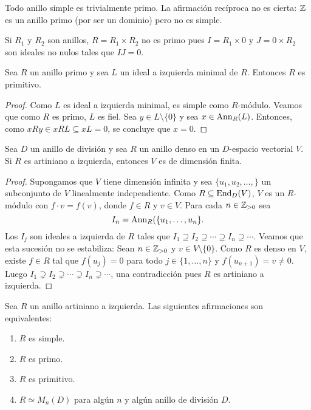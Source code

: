 \begin{example}
	Todo anillo simple es trivialmente primo. La afirmación recíproca no es
	cierta: $\mathbb{Z}$ es un anillo primo (por ser un dominio) pero no es simple.
\end{example}

\begin{example}
	Si $R_1$ y $R_2$ son anillos, $R=R_1\times R_2$ no es primo pues
	$I=R_1\times 0$ y $J=0\times R_2$ son ideales no nulos tales que $IJ=0$.
\end{example}

\begin{lemma}
	\label{lem:primoizqmin=>prim}
	Sea $R$ un anillo primo y sea $L$ un ideal a izquierda minimal de $R$.
	Entonces $R$ es primitivo.
\end{lemma}

\begin{proof}
	Como $L$ es ideal a izquierda minimal, es simple como $R$-módulo. Veamos
	que como $R$ es primo, $L$ es fiel. Sea $y\in L\setminus\{0\}$ y sea
	$x\in\operatorname{Ann}_R(L)$.  Entonces, como $xRy\in xRL\subseteq xL=0$, se concluye
	que $x=0$.
\end{proof}

\begin{lemma}
	\label{lem:denso_artiniano}
	Sea $D$ un anillo de división y sea $R$ un anillo denso en un
	$D$-espacio vectorial $V$. Si $R$ es artiniano a izquierda, 
	entonces $V$ es de dimensión finita.
\end{lemma}

\begin{proof}
	Supongamos que $V$ tiene dimensión infinita y sea $\{u_1,u_2,\dots,\}$ un
	subconjunto de $V$ linealmente independiente. Como $R\subseteq\operatorname{End}_D(V)$,
	$V$ es un $R$-módulo con $f\cdot v=f(v)$, donde $f\in R$ y $v\in V$. Para
	cada $n\in\mathbb{Z}_{>0}$ sea 
	\[
		I_n=\operatorname{Ann}_R(\{u_1,\dots,u_n\}.
	\]
	Los $I_j$ son ideales a izquierda de $R$ tales que $I_1\supseteq
	I_2\supseteq\cdots\supseteq I_n\supseteq\cdots$. Veamos que esta sucesión
	no se estabiliza: Sean $n\in\mathbb{Z}_{>0}$ y $v\in V\setminus\{0\}$. Como $R$ es denso
	en $V$, existe $f\in R$ tal que $f(u_j)=0$ para todo $j\in\{1,\dots,n\}$ y
	$f(u_{n+1})=v\ne0$. Luego $I_1\supsetneq I_2\supsetneq\cdots\supsetneq
	I_n\supsetneq\cdots$, una contradicción pues $R$ es artiniano a izquierda.
\end{proof}

\begin{theorem}[Wedderburn]
	Sea $R$ un anillo artiniano a izquierda. Las siguientes afirmaciones son
	equivalentes:
	\begin{enumerate}
		\item $R$ es simple.
		\item $R$ es primo.
		\item $R$ es primitivo.
		\item $R\simeq M_n(D)$ para algún $n$ y algún anillo de división $D$.
	\end{enumerate}
\end{theorem}

